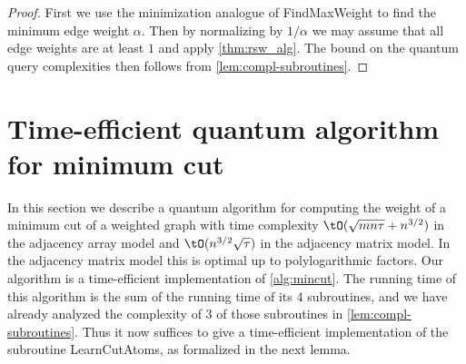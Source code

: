 \begin{proof}
First we use the minimization analogue of FindMaxWeight to find the minimum edge weight $\alpha$.  Then by normalizing by $1/\alpha$ we may assume that all 
edge weights are at least $1$ and apply \cref{thm:rsw_alg}.  The bound on the quantum query complexities then follows from \cref{lem:compl-subroutines}.
\end{proof}




\section{Time-efficient quantum algorithm for minimum cut} \label{sec:time-efficient}
In this section we describe a quantum algorithm for computing the weight of a minimum cut of a weighted graph with time complexity $\tO(\sqrt{mn\tau} + n^{3/2})$ in the adjacency array model and $\tO(n^{3/2}\sqrt{\tau})$ in the adjacency matrix model.
In the adjacency matrix model this is optimal up to polylogarithmic factors.
Our algorithm is a time-efficient implementation of \cref{alg:mincut}.  The running time of this algorithm is the sum of the running time of its 4 subroutines, and we have already 
analyzed the complexity of 3 of those subroutines in \cref{lem:compl-subroutines}.  Thus it now suffices to give a time-efficient implementation of the subroutine 
LearnCutAtoms, as formalized in the next lemma.

